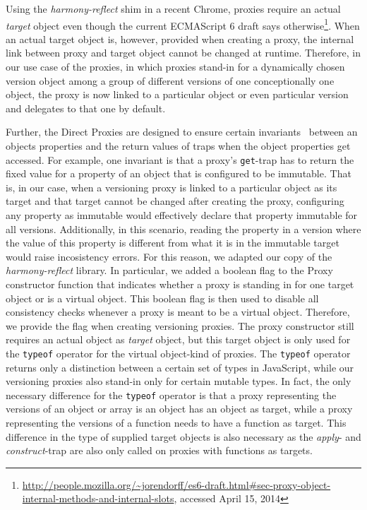 Using the \emph{harmony-reflect} shim in a recent Chrome, proxies require an actual \emph{target} object even though the current ECMAScript 6 draft says otherwise\footnote{\url{http://people.mozilla.org/~jorendorff/es6-draft.html\#sec-proxy-object-internal-methods-and-internal-slots}, accessed April 15, 2014}.
When an actual target object is, however, provided when creating a proxy, the internal link between proxy and target object cannot be changed at runtime.
Therefore, in our use case of the proxies, in which proxies stand-in for a dynamically chosen version object among a group of different versions of one conceptionally one object, the proxy is now linked to a particular object or even particular version and delegates to that one by default.


Further, the Direct Proxies are designed to ensure certain invariants~\cite{Cutsem2013TRP} between an objects properties and the return values of traps when the object properties get accessed.
For example, one invariant is that a proxy's \lstinline{get}-trap has to return the fixed value for a property of an object that is configured to be immutable.
That is, in our case, when a versioning proxy is linked to a particular object as its target and that target cannot be changed after creating the proxy, configuring any property as immutable would effectively declare that property immutable for all versions.
Additionally, in this scenario, reading the property in a version where the value of this property is different from what it is in the immutable target would raise incosistency errors.
For this reason, we adapted our copy of the \emph{harmony-reflect} library.
In particular, we added a boolean flag to the Proxy constructor function that indicates whether a proxy is standing in for one target object or is a virtual object.
This boolean flag is then used to disable all consistency checks whenever a proxy is meant to be a virtual object.
Therefore, we provide the flag when creating versioning proxies.
The proxy constructor still requires an actual object as \emph{target} object, but this target object is only used for the \lstinline{typeof} operator for the virtual object-kind of proxies.
The \lstinline{typeof} operator returns only a distinction between a certain set of types in JavaScript, while our versioning proxies also stand-in only for certain mutable types.
In fact, the only necessary difference for the \lstinline{typeof} operator is that a proxy representing the versions of an object or array is an object has an object as target, while a proxy representing the versions of a function needs to have a function as target.
This difference in the type of supplied target objects is also necessary as the \emph{apply}- and \emph{construct}-trap are also only called on proxies with functions as targets.



